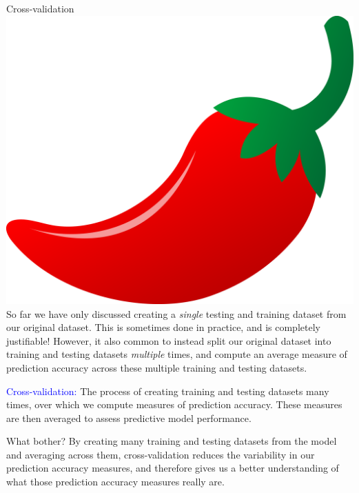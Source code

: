 \documentclass[10pt,t]{beamer}
\begin{document}
\begin{frame}{Cross-validation \includegraphics[scale=0.01]{figures/chilipepper.png} }
So far we have only discussed creating a \textit{single} testing and training dataset from our original dataset. This is sometimes done in practice, and is completely justifiable! However, it also common to instead split our original dataset into training and testing datasets \textit{multiple} times, and compute an average measure of prediction accuracy across these multiple training and testing datasets.

\vspace{0.3cm}

\textcolor{blue}{Cross-validation:} The process of creating training and testing datasets many times, over which we compute measures of prediction accuracy. These measures are then averaged to assess predictive model performance.

\vspace{0.3cm}

What bother? By creating many training and testing datasets from the model and averaging across them, cross-validation reduces the variability in our prediction accuracy measures, and therefore gives us a better understanding of what those prediction accuracy measures really are.

\end{frame}
\end{document}

